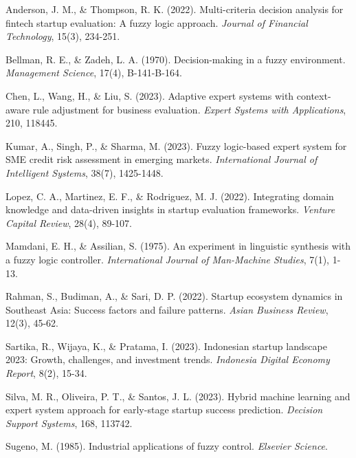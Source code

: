 \documentclass[12pt,a4paper]{article}
\begin{document}

\begin{thebibliography}{99}

Anderson, J. M., \& Thompson, R. K. (2022). Multi-criteria decision analysis for fintech startup evaluation: A fuzzy logic approach. \textit{Journal of Financial Technology}, 15(3), 234-251.

Bellman, R. E., \& Zadeh, L. A. (1970). Decision-making in a fuzzy environment. \textit{Management Science}, 17(4), B-141-B-164.

Chen, L., Wang, H., \& Liu, S. (2023). Adaptive expert systems with context-aware rule adjustment for business evaluation. \textit{Expert Systems with Applications}, 210, 118445.

Kumar, A., Singh, P., \& Sharma, M. (2023). Fuzzy logic-based expert system for SME credit risk assessment in emerging markets. \textit{International Journal of Intelligent Systems}, 38(7), 1425-1448.

Lopez, C. A., Martinez, E. F., \& Rodriguez, M. J. (2022). Integrating domain knowledge and data-driven insights in startup evaluation frameworks. \textit{Venture Capital Review}, 28(4), 89-107.

Mamdani, E. H., \& Assilian, S. (1975). An experiment in linguistic synthesis with a fuzzy logic controller. \textit{International Journal of Man-Machine Studies}, 7(1), 1-13.

Rahman, S., Budiman, A., \& Sari, D. P. (2022). Startup ecosystem dynamics in Southeast Asia: Success factors and failure patterns. \textit{Asian Business Review}, 12(3), 45-62.

Sartika, R., Wijaya, K., \& Pratama, I. (2023). Indonesian startup landscape 2023: Growth, challenges, and investment trends. \textit{Indonesia Digital Economy Report}, 8(2), 15-34.

Silva, M. R., Oliveira, P. T., \& Santos, J. L. (2023). Hybrid machine learning and expert system approach for early-stage startup success prediction. \textit{Decision Support Systems}, 168, 113742.

Sugeno, M. (1985). Industrial applications of fuzzy control. \textit{Elsevier Science}.


\end{thebibliography}
\end{document}
